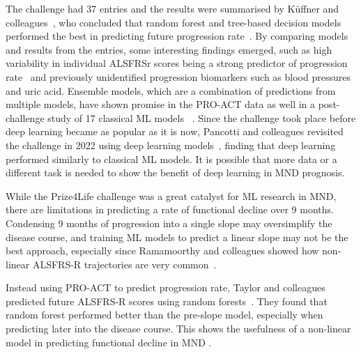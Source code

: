 The challenge had 37 entries and the results were summarised by Küffner and colleagues~\cite{kuffnerCrowdsourcedAnalysisClinical2015}, who concluded that random forest and tree-based decision models performed the best in predicting future progression rate~\cite{hothornRandomForest4LifeRandomForest2014}.
By comparing models and results from the entries, some interesting findings emerged, such as high variability in individual ALSFRSr scores being a strong predictor of progression rate~\cite{hothornRandomForest4LifeRandomForest2014} and previously unidentified progression biomarkers such as blood pressures and uric acid.
Ensemble models, which are a combination of predictions from multiple models, have shown promise in the PRO-ACT data as well in a post-challenge study of 17 classical ML models ~\cite{turabiehMachineLearningEmpowered2024}.
Since the challenge took place before deep learning became as popular as it is now, Pancotti and colleagues revisited the challenge in 2022 using deep learning models~\cite{pancottiDeepLearningMethods2022}, finding that deep learning performed similarly to classical ML models.
It is possible that more data or a different task is needed to show the benefit of deep learning in MND prognosis.

While the Prize4Life challenge was a great catalyst for ML research in MND, there are limitations in predicting a rate of functional decline over 9 months.
Condensing 9 months of progression into a single slope may oversimplify the disease course, and training ML models to predict a linear slope may not be the best approach, especially since Ramamoorthy and colleagues showed how non-linear ALSFRS-R trajectories are very common~\cite{ramamoorthyIdentifyingPatternsAmyotrophic2022}.


Instead using PRO-ACT to predict progression rate, Taylor and colleagues predicted future ALSFRS-R scores using random forests~\cite{taylorPredictingDiseaseProgression2016}.
They found that random forest performed better than the pre-slope model, especially when predicting later into the disease course.
This shows the usefulness of a non-linear model in predicting functional decline in MND .

